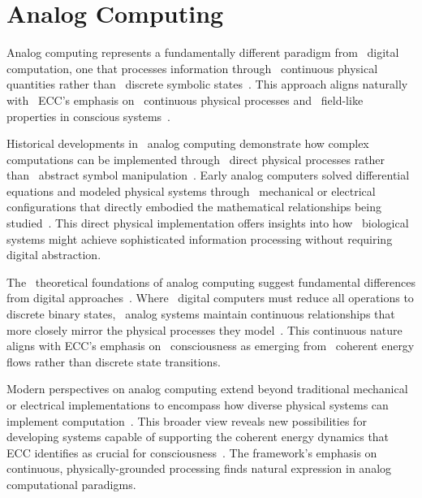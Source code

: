\section{Analog Computing}

 Analog computing represents a fundamentally different paradigm from~ digital computation, one that processes information through~ continuous physical quantities rather than~ discrete symbolic states~\cite{Shannon1941, Calude2018b}. This approach aligns naturally with~ ECC's emphasis on~ continuous physical processes and~ field-like properties in conscious systems~\cite{MacLennan2009, Werbos2018}.

Historical developments in~ analog computing demonstrate how complex computations can be implemented through~ direct physical processes rather than~ abstract symbol manipulation~\cite{Small2001, Bissell2004}. Early analog computers solved differential equations and modeled physical systems through~ mechanical or electrical configurations that directly embodied the mathematical relationships being studied~\cite{Aaronson2021b}. This direct physical implementation offers insights into how~ biological systems might achieve sophisticated information processing without requiring digital abstraction.

The~ theoretical foundations of analog computing suggest fundamental differences from digital approaches~\cite{Moore1996, Vergis1986}. Where~ digital computers must reduce all operations to discrete binary states,~ analog systems maintain continuous relationships that more closely mirror the physical processes they model~\cite{Toffoli2019}. This continuous nature aligns with ECC's emphasis on~ consciousness as emerging from~ coherent energy flows rather than discrete state transitions.

 Modern perspectives on analog computing extend beyond traditional mechanical or electrical implementations to encompass how diverse physical systems can implement computation~\cite{Mills2008, Bandyopadhyay2020}. This broader view reveals new possibilities for developing systems capable of supporting the coherent energy dynamics that ECC identifies as crucial for consciousness~\cite{Ulmann2013, Pockett2021}. The framework's emphasis on continuous, physically-grounded processing finds natural expression in analog computational paradigms.

